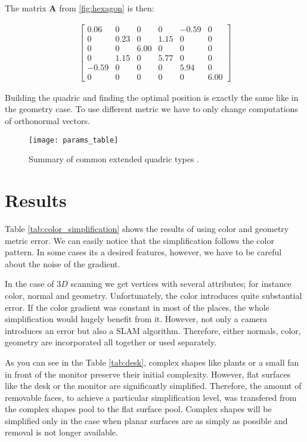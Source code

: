 The matrix $\mathbf{A}$ from \ref{fig:hexagon} is then:

\begin{align}
\left[
\begin{array}{rrrrrr}
0.06 & 0 & 0 & 0 & -0.59 & 0\\
0 & 0.23 & 0 & 1.15 & 0 & 0\\
0 & 0 & 6.00 & 0 & 0 & 0\\
0 & 1.15 & 0 & 5.77 & 0 & 0\\
-0.59 & 0 & 0 & 0 & 5.94 & 0\\
0 & 0 & 0 & 0 & 0 & 6.00
\end{array}\right]
\end{align}

Building the quadric and finding the optimal position is exactly the same like in the geometry case. To use different metric we have to only change computations of orthonormal vectors.

\begin{figure}[H]
  \begin{center}
    \texttt{[image: params\_table]}
    \caption{Summary of common extended quadric types \cite{garland99}.}
    \label{fig:params_table}
  \end{center}
\end{figure}

\section{Results}

Table \ref{tab:color_simplification} shows the results of using color and geometry metric error. We can easily notice that the simplification follows the color pattern. In some cases its a desired features, however, we have to be careful about the noise of the gradient.

In the case of $3D$ scanning we get vertices with several attributes; for instance color, normal and geometry. Unfortunately, the color introduces quite substantial error. If the color gradient was constant in most of the places, the whole simplification would hugely benefit from it. However, not only a camera introduces an error but also a SLAM algorithm. Therefore, either normals, color, geometry are incorporated all together or used separately.

As you can see in the Table \ref{tab:desk}, complex shapes like plants or a small fan in front of the monitor preserve their initial complexity. However, flat surfaces like the desk or the monitor are significantly simplified. Therefore, the amount of removable faces, to achieve a particular simplification level, was transfered from the complex shapes pool to the flat surface pool. Complex shapes will be simplified only in the case when planar surfaces are as simply as possible and removal is not longer available.


